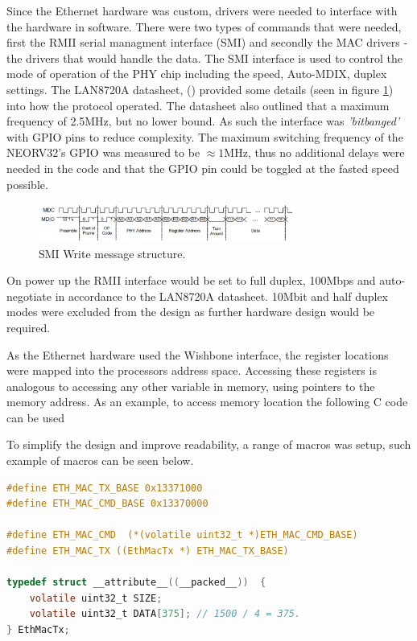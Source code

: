 Since the Ethernet hardware was custom, drivers were needed to interface with the hardware in software. There were two types of commands that were needed, first the RMII serial managment interface (SMI) and secondly the MAC drivers - the drivers that would handle the data.  The SMI interface is used to control the mode of operation of the PHY chip including the speed, Auto-MDIX, duplex settings. The LAN8720A datasheet, (\cite{LAN8720ADatasheet}) provided some details (seen in figure \ref{fig:smi_packet_structure}) into how the protocol operated. The datasheet also outlined that a maximum frequency of 2.5MHz, but no lower bound. As such the interface was \textit{'bitbanged'} with GPIO pins to reduce complexity. The maximum switching frequency of the NEORV32's GPIO was measured to be $\approx 1$MHz, thus no additional delays were needed in the code and that the GPIO pin could be toggled at the fasted speed possible. 


\begin{figure}[h!]
    \centering
    \includegraphics[width=0.75\textwidth]{Images/SMIWriteStructure.png}
    \caption[SMI Write message structure]{SMI Write message structure. \cite{LAN8720ADatasheet}}
    \label{fig:smi_packet_structure}
\end{figure}

On power up the RMII interface would be set to full duplex, 100Mbps and auto-negotiate in accordance to the LAN8720A datasheet. 10Mbit and half duplex modes were excluded from the design as further hardware design would be required.  

\newpage

As the Ethernet hardware used the Wishbone interface, the register locations were mapped into the processors address space. Accessing these registers is analogous to accessing any other variable in memory, using pointers to the memory address. As an example, to access memory location  the following C code can be used 


To simplify the design and improve readability, a range of macros was setup, such example of macros can be seen below. 

\begin{lstlisting}[language=C, caption=Python example]
#define ETH_MAC_TX_BASE 0x13371000
#define ETH_MAC_CMD_BASE 0x13370000

#define ETH_MAC_CMD  (*(volatile uint32_t *)ETH_MAC_CMD_BASE)
#define ETH_MAC_TX ((EthMacTx *) ETH_MAC_TX_BASE)

typedef struct __attribute__((__packed__))  {
    volatile uint32_t SIZE;
    volatile uint32_t DATA[375]; // 1500 / 4 = 375.
} EthMacTx;
\end{lstlisting}

